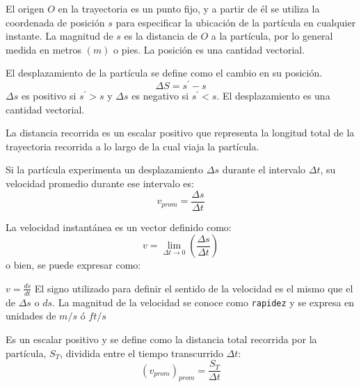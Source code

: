 \begin{definition}[Posición]
    El origen $O$ en la trayectoria es un punto fijo, y a partir de él se utiliza la coordenada de posición $s$ para especificar la ubicación de la partícula en cualquier instante.
    La magnitud de $s$ es la distancia de $O$ a la partícula, por lo general medida en metros $(m)$ o pies. La posición es una cantidad vectorial.
\end{definition}

\begin{definition}[Desplazamiento]
    El desplazamiento de la partícula se define como el cambio en su posición.
    \begin{equation}
        \Delta S=s^{\prime}-s
    \end{equation}
    $\Delta s$ es positivo si $s^{\prime}>s$ y $\Delta s$ es negativo si $s^{\prime}<s$. El desplazamiento es una cantidad vectorial.
\end{definition}

La distancia recorrida es un escalar positivo que representa la longitud total de la trayectoria recorrida a lo largo de la cual viaja la partícula.

\begin{definition}[Velocidad]
    Si la partícula experimenta un desplazamiento $\Delta s$ durante el intervalo $\Delta t$, su velocidad promedio durante ese intervalo es:
    \begin{equation}
        v_{prom}=\frac{\Delta s}{\Delta t}
    \end{equation}
\end{definition}

La velocidad instantánea es un vector definido como:
\begin{equation}
    v=\lim_{\Delta t\to 0} \left(\frac{\Delta s}{\Delta t}\right)
\end{equation}
o bien, se puede expresar como:
\begin{notation}
    $v=\frac{d s}{d t}$
        El signo utilizado para definir el sentido de la velocidad es el mismo que el de $\Delta s$ o $ds$. La magnitud de la velocidad se conoce como \texttt{rapidez} y se expresa en unidades de $m/s$ ó $ft/s$
\end{notation}

\begin{definition}
    Es un escalar positivo y se define como la distancia total recorrida por la partícula, $S_T$, dividida entre el tiempo transcurrido $\Delta t$:
    \begin{equation}
        \left(v_{prom}\right)_{prom}=\frac{S_T}{\Delta t}
    \end{equation}
\end{definition}

